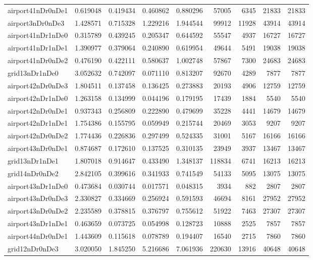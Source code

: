 \begin{longtable}{|l|r|r|r|r|r|r|r|r|}
airport41nDr0nDe1 & 0.619048 & 0.419434 & 0.460862 & 0.880296 & 57005 & 6345 & 21833 & 21833 \\
airport3nDr0nDe3 & 1.428571 & 0.715328 & 1.229216 & 1.944544 & 99912 & 11928 & 43914 & 43914 \\
airport41nDr1nDe0 & 0.315789 & 0.439245 & 0.205347 & 0.644592 & 55547 & 4937 & 16727 & 16727 \\
airport41nDr1nDe1 & 1.390977 & 0.379064 & 0.240890 & 0.619954 & 49644 & 5491 & 19038 & 19038 \\
airport41nDr0nDe2 & 0.476190 & 0.422111 & 0.580637 & 1.002748 & 57867 & 7300 & 24683 & 24683 \\
grid13nDr1nDe0 & 3.052632 & 0.742097 & 0.071110 & 0.813207 & 92670 & 4289 & 7877 & 7877 \\
airport42nDr0nDe3 & 1.804511 & 0.137458 & 0.136425 & 0.273883 & 20193 & 4906 & 12759 & 12759 \\
airport42nDr1nDe0 & 1.263158 & 0.134999 & 0.044196 & 0.179195 & 17439 & 1884 & 5540 & 5540 \\
airport42nDr0nDe1 & 0.937343 & 0.256809 & 0.222890 & 0.479699 & 35228 & 4441 & 14679 & 14679 \\
airport42nDr1nDe1 & 1.754386 & 0.155795 & 0.059949 & 0.215744 & 20469 & 3053 & 9207 & 9207 \\
airport42nDr0nDe2 & 1.774436 & 0.226836 & 0.297499 & 0.524335 & 31001 & 5167 & 16166 & 16166 \\
airport43nDr0nDe1 & 0.874687 & 0.172610 & 0.137525 & 0.310135 & 23949 & 3937 & 13467 & 13467 \\
grid13nDr1nDe1 & 1.807018 & 0.914647 & 0.433490 & 1.348137 & 118834 & 6741 & 16213 & 16213 \\
grid14nDr0nDe2 & 2.842105 & 0.399616 & 0.341933 & 0.741549 & 54133 & 5095 & 13075 & 13075 \\
airport43nDr1nDe0 & 0.473684 & 0.030744 & 0.017571 & 0.048315 & 3934 & 882 & 2807 & 2807 \\
airport43nDr0nDe3 & 2.330827 & 0.334669 & 0.256924 & 0.591593 & 46694 & 8161 & 27952 & 27952 \\
airport43nDr0nDe2 & 2.235589 & 0.378815 & 0.376797 & 0.755612 & 51922 & 7463 & 27307 & 27307 \\
airport43nDr1nDe1 & 0.463659 & 0.073725 & 0.054998 & 0.128723 & 10888 & 2525 & 7857 & 7857 \\
airport44nDr0nDe1 & 1.443609 & 0.115618 & 0.078789 & 0.194407 & 16540 & 2715 & 7860 & 7860 \\
grid12nDr0nDe3 & 3.020050 & 1.845250 & 5.216686 & 7.061936 & 220630 & 13916 & 40648 & 40648 \\

\end{longtable}
